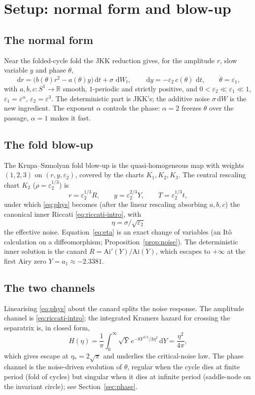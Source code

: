 \documentclass[11pt,reqno]{amsart}
\theoremstyle{plain}
\theoremstyle{definition}
\theoremstyle{remark}
\newcommand{\dd}{\,\mathrm{d}}
\newcommand{\R}{\mathbb{R}}
\newcommand{\Ai}{\mathrm{Ai}}
\newcommand{\ep}{\varepsilon}
\begin{document}
\section{Setup: normal form and blow-up}\label{sec:setup}

\subsection{The normal form}
Near the folded-cycle fold the JKK reduction \cite{JKK} gives, for the amplitude $r$, slow
variable $y$ and phase $\theta$,
\begin{equation}\label{eq:phys}
  \dd r=\bigl(b(\theta)r^2-a(\theta)y\bigr)\dd t+\sigma\,\dd W_t,\qquad
  \dd y=-\ep_2\,c(\theta)\,\dd t,\qquad \dot\theta=\ep_1,
\end{equation}
with $a,b,c\colon S^1\to\R$ smooth, $1$-periodic and strictly positive, and
$0<\ep_2\ll\ep_1\ll1$, $\ep_1=\ep^\alpha$, $\ep_2=\ep^3$. The deterministic part is JKK's;
the additive noise $\sigma\dd W$ is the new ingredient. The exponent $\alpha$ controls the
phase: $\alpha=2$ freezes $\theta$ over the passage, $\alpha=1$ makes it fast.

\subsection{The fold blow-up}
The Krupa--Szmolyan fold blow-up \cite{KS} is the quasi-homogeneous map with weights
$(1,2,3)$ on $(r,y,\ep_2)$, covered by the charts $K_1,K_2,K_3$. The central rescaling
chart $K_2$ ($\rho=\ep_2^{1/3}$) is
\begin{equation}\label{eq:K2}
  r=\ep_2^{1/3}R,\qquad y=\ep_2^{2/3}Y,\qquad T=\ep_2^{1/3}t,
\end{equation}
under which \eqref{eq:phys} becomes (after the linear rescaling absorbing $a,b,c$) the
canonical inner Riccati \eqref{eq:riccati-intro}, with
\begin{equation}\label{eq:eta}
  \eta=\sigma/\sqrt{\ep_2}
\end{equation}
the effective noise. Equation~\eqref{eq:eta} is an exact change of variables (an It\^o
calculation on a diffeomorphism; Proposition~\ref{prop:noise}). The deterministic inner
solution is the canard $R=\Ai'(Y)/\Ai(Y)$, which escapes to $+\infty$ at the first Airy zero
$Y=a_1\approx-2.3381$.

\subsection{The two channels}
Linearising \eqref{eq:phys} about the canard splits the noise response. The amplitude
channel is \eqref{eq:riccati-intro}; the integrated Kramers hazard for crossing the
separatrix is, in closed form,
\begin{equation}\label{eq:hazard}
  H(\eta)=\frac1\pi\int_0^\infty\!\sqrt Y\,e^{-8Y^{3/2}/3\eta^2}\dd Y=\frac{\eta^2}{4\pi},
\end{equation}
which gives escape at $\eta_*=2\sqrt\pi$ and underlies the critical-noise law. The phase
channel is the noise-driven evolution of $\theta$, regular when the cycle dies at finite
period (fold of cycles) but singular when it dies at infinite period (saddle-node on the
invariant circle); see Section~\ref{sec:phase}.
\end{document}

